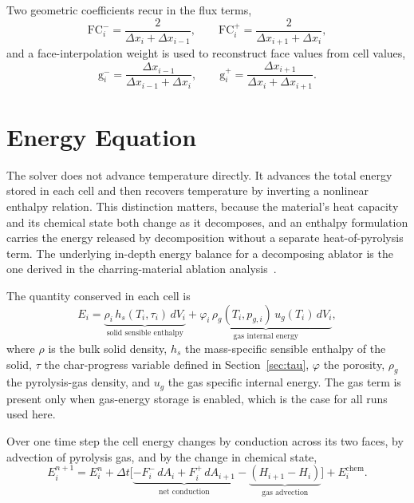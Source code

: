 \documentclass[11pt]{report}
\begin{document}
Two geometric coefficients recur in the flux terms,
\begin{equation}
\mathrm{FC}^-_i = \frac{2}{\Delta x_i + \Delta x_{i-1}}, \qquad
\mathrm{FC}^+_i = \frac{2}{\Delta x_{i+1} + \Delta x_i},
\end{equation}
and a face-interpolation weight is used to reconstruct face values from cell
values,
\begin{equation}
\mathrm{g}^-_i = \frac{\Delta x_{i-1}}{\Delta x_{i-1} + \Delta x_i}, \qquad
\mathrm{g}^+_i = \frac{\Delta x_{i+1}}{\Delta x_i + \Delta x_{i+1}} .
\end{equation}

\section{Energy Equation}

The solver does not advance temperature directly. It advances the total energy
stored in each cell and then recovers temperature by inverting a nonlinear
enthalpy relation. This distinction matters, because the material's heat capacity
and its chemical state both change as it decomposes, and an enthalpy formulation
carries the energy released by decomposition without a separate heat-of-pyrolysis
term. The underlying in-depth energy balance for a decomposing ablator is the one
derived in the charring-material ablation analysis~\cite{moyer1968cma}.

The quantity conserved in each cell is
\begin{equation}
E_i = \underbrace{\rho_i\, h_s(T_i, \tau_i)\, dV_i}_{\text{solid sensible enthalpy}}
    + \underbrace{\varphi_i\, \rho_g(T_i, p_{g,i})\, u_g(T_i)\, dV_i}_{\text{gas internal energy}},
\label{eq:energy_state}
\end{equation}
where $\rho$ is the bulk solid density, $h_s$ the mass-specific sensible enthalpy
of the solid, $\tau$ the char-progress variable defined in
Section~\ref{sec:tau}, $\varphi$ the porosity, $\rho_g$ the pyrolysis-gas
density, and $u_g$ the gas specific internal energy. The gas term is present only
when gas-energy storage is enabled, which is the case for all runs used here.

Over one time step the cell energy changes by conduction across its two faces, by
advection of pyrolysis gas, and by the change in chemical state,
\begin{equation}
E_i^{n+1} = E_i^{n}
  + \Delta t \Big[ \underbrace{-F^-_i\, dA_i + F^+_i\, dA_{i+1}}_{\text{net conduction}}
  - \underbrace{\left(H_{i+1} - H_i\right)}_{\text{gas advection}} \Big]
  + E^{\mathrm{chem}}_i .
\label{eq:energy_update}
\end{equation}
\end{document}
